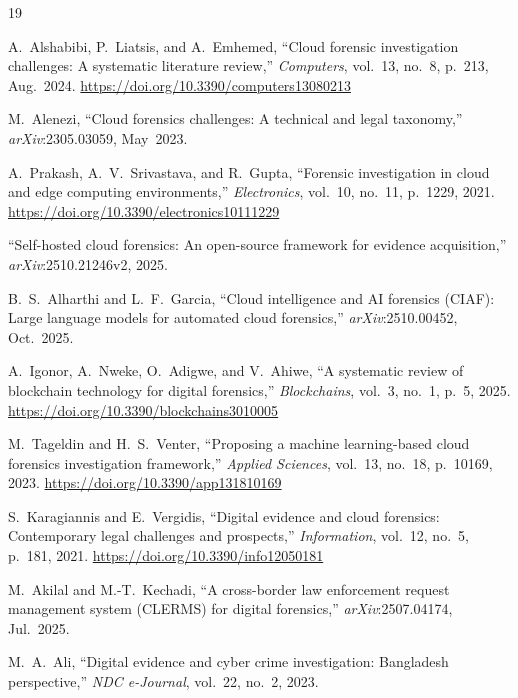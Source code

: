 \documentclass[sigconf,nonacm]{acmart}
\begin{document}
\balance

\begin{thebibliography}{19}

A.~Alshabibi, P.~Liatsis, and A.~Emhemed,
``Cloud forensic investigation challenges: A systematic literature review,''
\textit{Computers}, vol.~13, no.~8, p.~213, Aug.~2024.
\newblock \url{https://doi.org/10.3390/computers13080213}

M.~Alenezi,
``Cloud forensics challenges: A technical and legal taxonomy,''
\textit{arXiv}:2305.03059, May~2023.

A.~Prakash, A.~V.~Srivastava, and R.~Gupta,
``Forensic investigation in cloud and edge computing environments,''
\textit{Electronics}, vol.~10, no.~11, p.~1229, 2021.
\newblock \url{https://doi.org/10.3390/electronics10111229}

``Self-hosted cloud forensics: An open-source framework for evidence
acquisition,''
\textit{arXiv}:2510.21246v2, 2025.

B.~S.~Alharthi and L.~F.~Garcia,
``Cloud intelligence and AI forensics (CIAF): Large language models for
automated cloud forensics,''
\textit{arXiv}:2510.00452, Oct.~2025.

A.~Igonor, A.~Nweke, O.~Adigwe, and V.~Ahiwe,
``A systematic review of blockchain technology for digital forensics,''
\textit{Blockchains}, vol.~3, no.~1, p.~5, 2025.
\newblock \url{https://doi.org/10.3390/blockchains3010005}

M.~Tageldin and H.~S.~Venter,
``Proposing a machine learning-based cloud forensics investigation
framework,''
\textit{Applied Sciences}, vol.~13, no.~18, p.~10169, 2023.
\newblock \url{https://doi.org/10.3390/app131810169}

S.~Karagiannis and E.~Vergidis,
``Digital evidence and cloud forensics: Contemporary legal challenges and
prospects,''
\textit{Information}, vol.~12, no.~5, p.~181, 2021.
\newblock \url{https://doi.org/10.3390/info12050181}

M.~Akilal and M.-T.~Kechadi,
``A cross-border law enforcement request management system (CLERMS) for
digital forensics,''
\textit{arXiv}:2507.04174, Jul.~2025.

M.~A.~Ali,
``Digital evidence and cyber crime investigation: Bangladesh perspective,''
\textit{NDC e-Journal}, vol.~22, no.~2, 2023.


\end{thebibliography}
\end{document}
